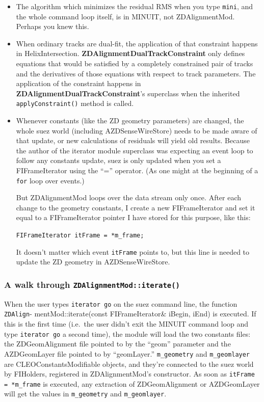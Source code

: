 \documentclass[12pt]{article}
\begin{document}
\begin{itemize}

  \item The algorithm which minimizes the residual RMS when you type
  {\tt mini}, and the whole command loop itself, is in MINUIT, not
  ZDAlignmentMod.  Perhaps you knew this.

  \item When ordinary tracks are dual-fit, the application of that
  constraint happens in HelixIntersection.
  {\bf ZDAlignmentDualTrackConstraint} only defines equations that
  would be satisfied by a completely constrained pair of tracks and
  the derivatives of those equations with respect to track parameters.
  The application of the constraint happens in
  {\bf ZDAlignmentDualTrackConstraint}'s superclass when the inherited
  {\tt applyConstraint()} method is called.

  \item Whenever constants (like the ZD geometry parameters) are
  changed, the whole suez world (including AZDSenseWireStore) needs to
  be made aware of that update, or new calculations of residuals will
  yield old results.  Because the author of the iterator module
  superclass was expecting an event loop to follow any constants
  update, suez is only updated when you set a FIFrameIterator using
  the ``='' operator.  (As one might at the beginning of a {\tt for}
  loop over events.)

  But ZDAlignmentMod loops over the data stream only once.  After each
  change to the geometry constants, I create a new FIFrameIterator and
  set it equal to a FIFrameIterator pointer I have stored for this
  purpose, like this:
  \begin{center}
    \tt FIFrameIterator itFrame = *m\_frame;
  \end{center}
  It doesn't matter which event {\tt itFrame} points to, but this line
  is needed to update the ZD geometry in AZDSenseWireStore.

\end{itemize}

\subsubsection{A walk through {\tt ZDAlignmentMod::iterate()}}

When the user types {\tt iterator go} on the suez command line, the
function {\tt ZDAlign}- {mentMod::iterate(const FIFrameIterator\&
iBegin, iEnd)} is executed.  If this is the first time (i.e.\ the user
didn't exit the MINUIT command loop and type {\tt iterator go} a
second time), the module will load the two constants files: the
ZDGeomAlignment file pointed to by the ``geom'' parameter and the
AZDGeomLayer file pointed to by ``geomLayer.''  {\tt m\_geometry} and
{\tt m\_geomlayer} are CLEOConstantsModifiable objects, and they're
connected to the suez world by FIHolders, registered in
ZDAlignmentMod's constructor.  As soon as {\tt itFrame = *m\_frame} is
executed, any extraction of ZDGeomAlignment or AZDGeomLayer will get
the values in {\tt m\_geometry} and {\tt m\_geomlayer}.
\end{document}
